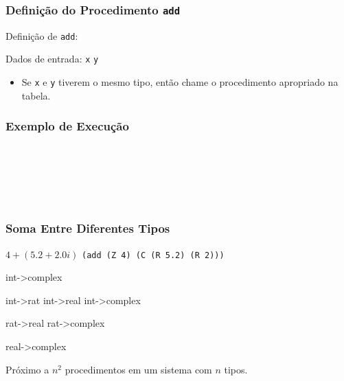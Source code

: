 \begin{frame}[fragile]
  \frametitle{Definição do Procedimento \texttt{add}}

  Definição de \texttt{add}:

  \pause
  \vspace{2em}
  Dados de entrada: \texttt{x} \texttt{y}

  \pause
  \vspace{2em}
  \begin{itemize}
    \item Se \texttt{x} e \texttt{y} tiverem o mesmo tipo, então chame o procedimento apropriado na tabela.
  \end{itemize}

\end{frame}


\begin{frame}
  \frametitle{Exemplo de Execução}

\\

\pause
\vspace{1cm}

\\

\pause
\vspace{1cm}

\\

\end{frame}



\begin{frame}[fragile]
  \frametitle{Soma Entre Diferentes Tipos}

  $4 + (5.2 + 2.0i)$ \hfill \texttt{(add (Z 4) (C (R 5.2) (R 2)))}
  \pause
  \vspace{2em}

  \begin{code}
int->complex
  \end{code}

  \pause
  \vspace{2em}

  \begin{code}
int->rat      int->real     int->complex

rat->real     rat->complex

real->complex
  \end{code}

  \pause
  \vspace{2em}
  Próximo a $n^2$ procedimentos em um sistema com $n$ tipos.

\end{frame}



